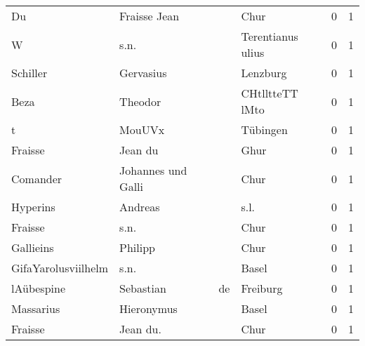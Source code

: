 \begin{center}
\begin{tiny}
\begin{longtabu}{llllrr}
                       Du &                       Fraisse Jean &             &                                        Chur &          0 &         1 \\
                        W &                               s.n. &             &                           Terentianus ulius &          0 &         1 \\
                 Schiller &                          Gervasius &             &                                    Lenzburg &          0 &         1 \\
                     Beza &                            Theodor &             &                             CHtlltteTT lMto &          0 &         1 \\
                        t &                             MouUVx &             &                                    Tübingen &          0 &         1 \\
                  Fraisse &                            Jean du &             &                                        Ghur &          0 &         1 \\
                 Comander &                 Johannes und Galli &             &                                        Chur &          0 &         1 \\
                 Hyperins &                            Andreas &             &                                        s.l. &          0 &         1 \\
                  Fraisse &                               s.n. &             &                                        Chur &          0 &         1 \\
                Gallieins &                            Philipp &             &                                        Chur &          0 &         1 \\
      GifaYarolusviilhelm &                               s.n. &             &                                       Basel &          0 &         1 \\
               lAübespine &                          Sebastian &          de &                                    Freiburg &          0 &         1 \\
                Massarius &                         Hieronymus &             &                                       Basel &          0 &         1 \\
                  Fraisse &                           Jean du. &             &                                        Chur &          0 &         1 \\

\end{longtabu}
\end{tiny}
\end{center}

